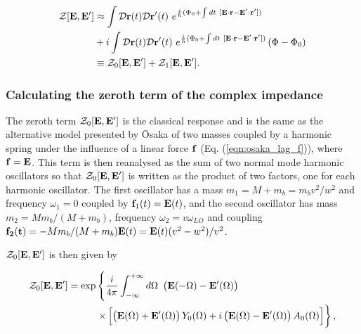\begin{equation}
    \begin{aligned}
    \mathcal{Z}[\vb{E}, \vb{E'}] &\approx \int \mathcal{D}\vb{r}(t)\mathcal{D}\vb{r'}(t)\ e^{\frac{i}{\hbar} (\Phi_0 + \int dt\ [\vb{E} \cdot \vb{r} - \vb{E'} \cdot \vb{r'}])} \\
    &+ i\int \mathcal{D}\mathbf{r}(t) \mathcal{D}\mathbf{r'}(t)\ e^{\frac{i}{\hbar} (\Phi_0 + \int dt\ [\vb{E} \cdot \vb{r} - \vb{E'} \cdot \vb{r'}])}\left(\Phi - \Phi_0\right) \\
    &\equiv \mathcal{Z}_0[\vb{E}, \vb{E'}] + \mathcal{Z}_1[\vb{E}, \vb{E'}].
    \end{aligned}
\end{equation}

\subsubsection{Calculating the zeroth term of the complex impedance}
\label{subsubsec:2-3-1-2}

The zeroth term $\mathcal{Z}_0[\vb{E}, \vb{E'}]$ is the classical response and is the same as the alternative model presented by \=Osaka of two masses coupled by a harmonic spring under the influence of a linear force $\vb{f}$ (Eq. (\ref{eqn:osaka_lag_f})), where $\vb{f} = \vb{E}$. This term is then reanalysed as the sum of two normal mode harmonic oscillators so that $\mathcal{Z}_0[\vb{E}, \vb{E'}]$ is written as the product of two factors, one for each harmonic oscillator. The first oscillator has a mass $m_1 = M + m_b = m_b v^2 / w^2$ and frequency $\omega_1 = 0$ coupled by $\vb{f}_1(t) = \vb{E}(t)$, and the second oscillator has mass $m_2 = M m_b / (M + m_b)$, frequency $\omega_2 = v \omega_{LO}$ and coupling $\vb{f_2(t)} = - M m_b / (M + m_b) \vb{E}(t) = \vb{E}(t) (v^2 - w^2) / v^2$. 

$\mathcal{Z}_0[\vb{E}, \vb{E'}]$ is then given by

\begin{equation}\label{eqn:Z0}
    \begin{aligned}
        \mathcal{Z}_0[\vb{E}, \vb{E'}] = \exp &\left\{ \frac{i}{4\pi} \int^{+\infty}_{-\infty}d\Omega\ \left( \vb{E}(-\Omega) - \vb{E'}(\Omega) \right) \right. \\
        &\left. \times \left[ \left( \vb{E}(\Omega) + \vb{E'}(\Omega) \right) Y_0(\Omega)
         + i \left( \vb{E}(\Omega) - \vb{E'}(\Omega) \right) A_0(\Omega) \right]\right\},
    \end{aligned}
\end{equation}

